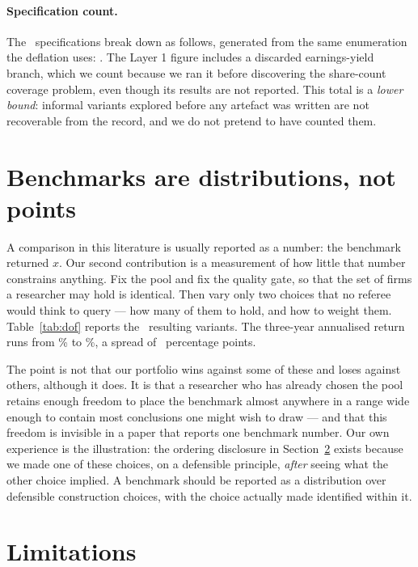 \documentclass[a4paper,11pt]{article}
\begin{document}
\paragraph{Specification count.} The \SpecTotal\ specifications break down as follows, generated from
the same enumeration the deflation uses: \SpecBreakdown. The Layer 1 figure includes a discarded
earnings-yield branch, which we count because we ran it before discovering the share-count coverage
problem, even though its results are not reported. This total is a \emph{lower bound}: informal
variants explored before any artefact was written are not recoverable from the record, and we do not
pretend to have counted them.



\section{Benchmarks are distributions, not points}\label{sec:benchmark}

A comparison in this literature is usually reported as a number: the benchmark returned $x$. Our
second contribution is a measurement of how little that number constrains anything. Fix the pool and
fix the quality gate, so that the set of firms a researcher may hold is identical. Then vary only two
choices that no referee would think to query --- how many of them to hold, and how to weight them.
Table~\ref{tab:dof} reports the \DofVariants\ resulting variants. The three-year annualised return
runs from \DofMin\% to \DofMax\%, a spread of \DofSpread\ percentage points.

The point is not that our portfolio wins against some of these and loses against others, although
it does. It is that a researcher who has already chosen the pool retains enough freedom to place the
benchmark almost anywhere in a range wide enough to contain most conclusions one might wish to draw
--- and that this freedom is invisible in a paper that reports one benchmark number. Our own
experience is the illustration: the ordering disclosure in Section~\ref{sec:limitations} exists
because we made one of these choices, on a defensible principle, \emph{after} seeing what the other
choice implied. A benchmark should be reported as a distribution over defensible construction
choices, with the choice actually made identified within it.



\section{Limitations}\label{sec:limitations}
\end{document}
